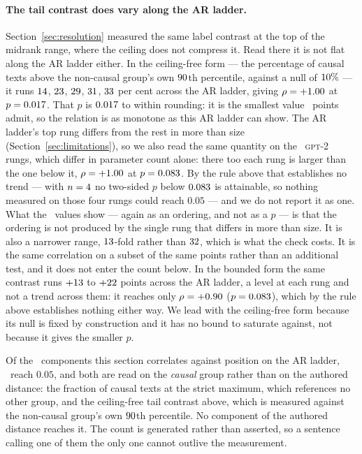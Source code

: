 \paragraph{The tail contrast does vary along the AR ladder.}
Section~\ref{sec:resolution} measured the same label contrast at the top of
the midrank range, where the ceiling does not compress it.  Read there it is not
flat
along the AR ladder either.  In the ceiling-free form --- the percentage of
causal texts above the non-causal group's own $90$th percentile,
against a null of $10\%$ --- it runs $14$,
$23$, $29$, $31$,
$33$ per cent across the AR ladder, giving $\rho = +1.00$ at
$p = 0.017$.  That $p$ is $0.017$ to within rounding: it is
the smallest value \TrendNEval\ points admit, so the relation is as
monotone as this AR ladder can show.  The AR ladder's top rung differs from the
rest in more than size (Section~\ref{sec:limitations}), so we also read the
same quantity on the \TailZFamNEval\ \textsc{gpt-2} rungs, which differ in
parameter count alone: there too each rung is larger than the one below it, $\rho =
+1.00$ at $p = 0.083$.  By the rule above that establishes no
trend --- with $n = 4$ no two-sided $p$ below
$0.083$ is attainable, so nothing measured on those four rungs could
reach $0.05$ --- and we do not report it as one.  What the
\TailZFamNEval\ values show --- again as an ordering, and not as a $p$ ---
is that the ordering is not produced by the single rung that differs in more
than size.  It is also a narrower range, $13$-fold rather
than $32$, which is what the check costs.  It is the same correlation on a subset of the same points rather than
an additional test, and it does not enter the count below.  In the bounded form the same contrast
runs $+13$ to $+22$ points across the AR ladder, a level
at each rung and not a trend across them: it reaches only $\rho =
+0.90$ ($p = 0.083$), which by the rule above establishes
nothing either way.  We lead with the ceiling-free form because its null
is fixed by construction and it has no bound to saturate against, not
because it gives the smaller $p$.

Of the \TrendNTested\ components this section correlates against
position on the AR ladder, \TrendNSignificant\ reach $0.05$, and both are read on the
\emph{causal} group rather than on the authored distance: the fraction of
causal texts at the strict maximum, which references no other group,
and the ceiling-free tail contrast above, which is measured against the
non-causal group's own $90$th percentile.  No component of the authored distance reaches it.  The
count is generated rather than asserted, so a sentence calling one of them
the only one cannot outlive the measurement.

